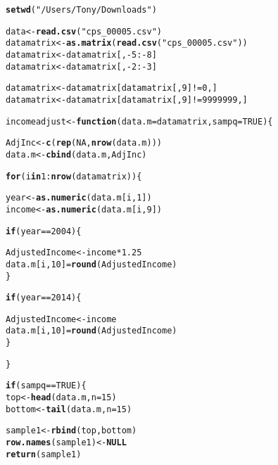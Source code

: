 \documentclass{article}\usepackage[]{graphicx}\usepackage[]{color}
\makeatletter
\newcommand{\hlnum}[1]{\textcolor[rgb]{0.686,0.059,0.569}{#1}}%
\newcommand{\hlstr}[1]{\textcolor[rgb]{0.192,0.494,0.8}{#1}}%
\newcommand{\hlopt}[1]{\textcolor[rgb]{0,0,0}{#1}}%
\newcommand{\hlstd}[1]{\textcolor[rgb]{0.345,0.345,0.345}{#1}}%
\newcommand{\hlkwa}[1]{\textcolor[rgb]{0.161,0.373,0.58}{\textbf{#1}}}%
\newcommand{\hlkwb}[1]{\textcolor[rgb]{0.69,0.353,0.396}{#1}}%
\newcommand{\hlkwc}[1]{\textcolor[rgb]{0.333,0.667,0.333}{#1}}%
\newcommand{\hlkwd}[1]{\textcolor[rgb]{0.737,0.353,0.396}{\textbf{#1}}}%
\newenvironment{kframe}{%
 \def\at@end@of@kframe{}%
 \ifinner\ifhmode%
  \def\at@end@of@kframe{\end{minipage}}%
  \begin{minipage}{\columnwidth}%
 \fi\fi%
 \def\FrameCommand##1{\hskip\@totalleftmargin \hskip-\fboxsep
 \colorbox{shadecolor}{##1}\hskip-\fboxsep
     \hskip-\linewidth \hskip-\@totalleftmargin \hskip\columnwidth}%
 \MakeFramed {\advance\hsize-\width
   \@totalleftmargin\z@ \linewidth\hsize
   \@setminipage}}%
 {\par\unskip\endMakeFramed%
 \at@end@of@kframe}
\newenvironment{knitrout}{}{} %
\makeatother
\begin{document}
\begin{knitrout}
\begin{kframe}
\begin{alltt}
\hlkwd{setwd}\hlstd{(}\hlstr{"/Users/Tony/Downloads"}\hlstd{)}

\hlstd{data} \hlkwb{<-} \hlkwd{read.csv}\hlstd{(}\hlstr{"cps_00005.csv"}\hlstd{)}
\hlstd{datamatrix} \hlkwb{<-} \hlkwd{as.matrix}\hlstd{(}\hlkwd{read.csv}\hlstd{(}\hlstr{"cps_00005.csv"}\hlstd{))}
\hlstd{datamatrix} \hlkwb{<-} \hlstd{datamatrix[,}\hlopt{-}\hlnum{5}\hlopt{:-}\hlnum{8}\hlstd{]}
\hlstd{datamatrix} \hlkwb{<-} \hlstd{datamatrix[,}\hlopt{-}\hlnum{2}\hlopt{:-}\hlnum{3}\hlstd{]}


\hlstd{datamatrix} \hlkwb{<-} \hlstd{datamatrix[datamatrix[,}\hlnum{9}\hlstd{]}\hlopt{!=} \hlnum{0}\hlstd{,]}
\hlstd{datamatrix} \hlkwb{<-} \hlstd{datamatrix[datamatrix[,}\hlnum{9}\hlstd{]}\hlopt{!=} \hlnum{9999999}\hlstd{,]}



\hlstd{incomeadjust} \hlkwb{<-} \hlkwa{function}\hlstd{(}\hlkwc{data.m} \hlstd{= datamatrix,} \hlkwc{sampq} \hlstd{=} \hlnum{TRUE}\hlstd{)\{}

  \hlstd{AdjInc} \hlkwb{<-} \hlkwd{c}\hlstd{(}\hlkwd{rep}\hlstd{(}\hlnum{NA}\hlstd{,} \hlkwd{nrow}\hlstd{(data.m)))}
  \hlstd{data.m} \hlkwb{<-} \hlkwd{cbind}\hlstd{(data.m, AdjInc)}

  \hlkwa{for} \hlstd{(i} \hlkwa{in} \hlnum{1}\hlopt{:}\hlkwd{nrow}\hlstd{(datamatrix))\{}

    \hlstd{year} \hlkwb{<-} \hlkwd{as.numeric}\hlstd{(data.m[i,}\hlnum{1}\hlstd{])}
    \hlstd{income} \hlkwb{<-} \hlkwd{as.numeric}\hlstd{(data.m[i,}\hlnum{9}\hlstd{])}

    \hlkwa{if} \hlstd{(year} \hlopt{==} \hlnum{2004}\hlstd{)\{}

      \hlstd{AdjustedIncome} \hlkwb{<-} \hlstd{income} \hlopt{*} \hlnum{1.25}
      \hlstd{data.m[i,}\hlnum{10}\hlstd{]} \hlkwb{=} \hlkwd{round}\hlstd{(AdjustedIncome)}
    \hlstd{\}}

    \hlkwa{if} \hlstd{(year} \hlopt{==} \hlnum{2014}\hlstd{)\{}

      \hlstd{AdjustedIncome} \hlkwb{<-} \hlstd{income}
      \hlstd{data.m[i,}\hlnum{10}\hlstd{]} \hlkwb{=} \hlkwd{round}\hlstd{(AdjustedIncome)}
    \hlstd{\}}


  \hlstd{\}}

 \hlkwa{if} \hlstd{(sampq} \hlopt{==} \hlnum{TRUE}\hlstd{)\{}
  \hlstd{top} \hlkwb{<-} \hlkwd{head}\hlstd{(data.m,} \hlkwc{n}\hlstd{=}\hlnum{15}\hlstd{)}
  \hlstd{bottom}\hlkwb{<-} \hlkwd{tail}\hlstd{(data.m,} \hlkwc{n}\hlstd{=}\hlnum{15}\hlstd{)}

  \hlstd{sample1} \hlkwb{<-} \hlkwd{rbind}\hlstd{(top,bottom)}
  \hlkwd{row.names}\hlstd{(sample1)} \hlkwb{<-} \hlkwa{NULL}
  \hlkwd{return}\hlstd{(sample1)}


\end{alltt}
\end{kframe}
\end{knitrout}
\end{document}

